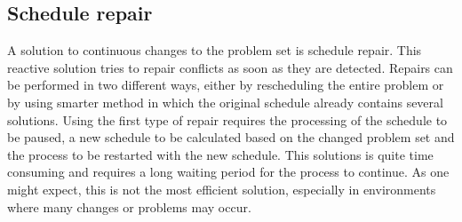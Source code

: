 \documentclass{article}
\begin{document}
\subsection{Schedule repair} \cite{policella07}
A solution to continuous changes to the problem set is schedule repair.
This reactive solution tries to repair conflicts as soon as they are detected.
Repairs can be performed in two different ways, either by rescheduling the entire problem or by using  smarter method in which the original schedule already contains several solutions.
Using the first type of repair requires the processing of the schedule to be paused, a new schedule to be calculated based on the changed problem set and the process to be restarted with the new schedule.
This solutions is quite time consuming and requires a long waiting period for the process to continue.
As one might expect, this is not the most efficient solution, especially in environments where many changes or problems may occur.


%
%
\end{document}
